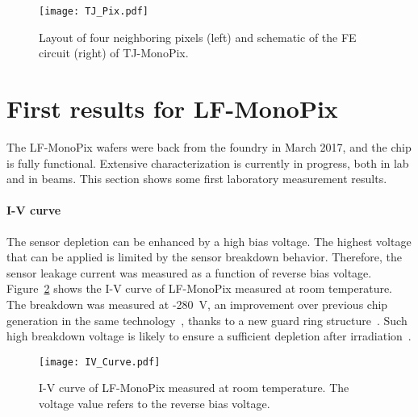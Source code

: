 \documentclass[a4paper,11pt]{article}
\begin{document}

\begin{figure}[htbp]
  \centering
  \texttt{[image: TJ\_Pix.pdf]}
  \caption{Layout of four neighboring pixels (left) and schematic of the FE circuit (right) of TJ-MonoPix.} 
  \label{fig:TJ_Pix}
\end{figure}


\section{First results for LF-MonoPix}
\label{sec:Measurements}

The LF-MonoPix wafers were back from the foundry in March 2017, and the chip is fully functional. Extensive characterization is currently in progress, both in lab and in beams. This section shows some first laboratory measurement results. 

\paragraph{I-V curve}
The sensor depletion can be enhanced by a high bias voltage. The highest voltage that can be applied is limited by the sensor breakdown behavior. Therefore, the sensor leakage current was measured as a function of reverse bias voltage. Figure~\ref{fig:IV_Curve} shows the I-V curve of LF-MonoPix measured at room temperature. 
The breakdown was measured at -280~V, an improvement over previous chip generation in the same technology~\cite{CCPD_FirstResults_2016}, thanks to a new guard ring structure~\cite{LFCPIX_Yavuz_2017}. Such high breakdown voltage is likely to ensure a sufficient depletion after irradiation~\cite{LF_Passive_Mandić_2017,LF_Mandić_2017}.

\begin{figure}[htbp]
  \centering
  \texttt{[image: IV\_Curve.pdf]}
  \caption{I-V curve of LF-MonoPix measured at room temperature. The voltage value refers to the reverse bias voltage.} 
  \label{fig:IV_Curve}
\end{figure}
\end{document}
